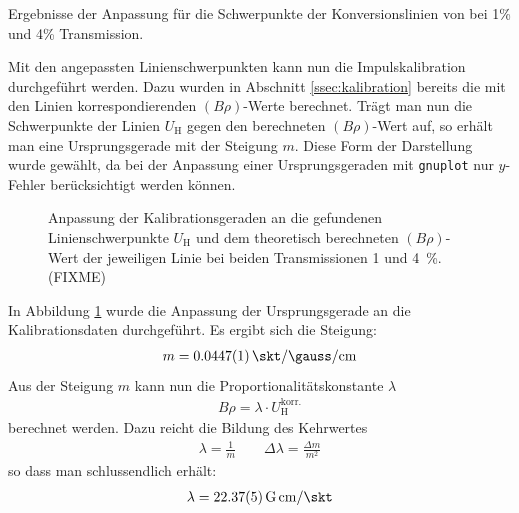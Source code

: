 \documentclass[11pt, a4paper]{article}
\numberwithin{equation}{section}
\begin{document}
\begin{table}[h]
	\centering
	
	\caption{Ergebnisse der Anpassung für die Schwerpunkte der Konversionslinien von  bei 1\% und 4\% Transmission.}
	\label{tab:fitergebnisse_ba}
\end{table}
Mit den angepassten Linienschwerpunkten kann nun die Impulskalibration durchgeführt werden.
Dazu wurden in Abschnitt \ref{ssec:kalibration} bereits die mit den Linien korrespondierenden $(B \rho)$-Werte berechnet.
Trägt man nun die Schwerpunkte der Linien $U_\mathrm{H}$ gegen den berechneten $(B \rho)$-Wert auf, so erhält man eine Ursprungsgerade mit der Steigung $m$.
Diese Form der Darstellung wurde gewählt, da bei der Anpassung einer Ursprungsgeraden mit \texttt{gnuplot} nur $y$-Fehler berücksichtigt werden können.
\begin{figure}[h]
	\centering
	
	\caption{Anpassung der Kalibrationsgeraden an die gefundenen Linienschwerpunkte $U_\mathrm{H}$ und dem theoretisch berechneten $(B \rho)$-Wert der jeweiligen Linie bei beiden Transmissionen \num{1} und \SI{4}{\percent}. (FIXME)}
	\label{fig:kalibration}
\end{figure}
In Abbildung \ref{fig:kalibration} wurde die Anpassung der Ursprungsgerade  an die Kalibrationsdaten durchgeführt.
Es ergibt sich die Steigung:
\begin{align}
	m = \SI{0.0447 +- 0.0001}{\skt\per \gauss \per \centi\metre}
\end{align}
Aus der Steigung $m$ kann nun die Proportionalitätskonstante $\lambda$
\begin{align}
	B \rho = \lambda \cdot U_\mathrm{H}^\mathrm{korr.}
\end{align}
berechnet werden.
Dazu reicht die Bildung des Kehrwertes
\begin{align}
	\lambda = \frac{1}{m} \qquad \Delta \lambda = \frac{\Delta m}{m^2}
\end{align}
so dass man schlussendlich erhält:
\begin{align}
	\lambda = \SI{22.37 +- 0.05}{G.cm\per\skt}
\end{align}
\end{document}
